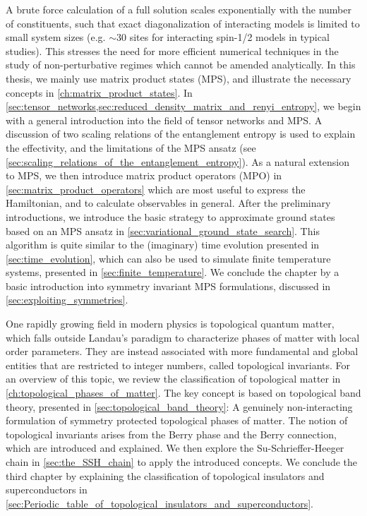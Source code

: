 A brute force calculation of a full solution scales exponentially with the number of constituents, such that exact diagonalization of interacting models is limited to small system sizes (e.g. $\sim 30$ sites for interacting spin-1/2 models in typical studies).
This stresses the need for more efficient numerical techniques in the study of non-perturbative regimes which cannot be amended analytically.
In this thesis, we mainly use matrix product states (MPS), and illustrate the necessary concepts in \cref{ch:matrix_product_states}.
In \cref{sec:tensor_networks,sec:reduced_density_matrix_and_renyi_entropy}, we begin with a general introduction into the field of tensor networks and MPS.
A discussion of two scaling relations of the entanglement entropy is used to explain the effectivity, and the limitations of the MPS ansatz (see \cref{sec:scaling_relations_of_the_entanglement_entropy}).
As a natural extension to MPS, we then introduce matrix product operators (MPO) in \cref{sec:matrix_product_operators} which are most useful to express the Hamiltonian, and to calculate observables in general.
After the preliminary introductions, we introduce the basic strategy to approximate ground states based on an MPS ansatz in \cref{sec:variational_ground_state_search}.
This algorithm is quite similar to the (imaginary) time evolution presented in \cref{sec:time_evolution}, which can also be used to simulate finite temperature systems, presented in \cref{sec:finite_temperature}.
We conclude the chapter by a basic introduction into symmetry invariant MPS formulations, discussed in \cref{sec:exploiting_symmetries}.

One rapidly growing field in modern physics is topological quantum matter, which falls outside Landau's paradigm to characterize phases of matter with local order parameters.
They are instead associated with more fundamental and global entities that are restricted to integer numbers, called topological invariants.
For an overview of this topic, we review the classification of topological matter in \cref{ch:topological_phases_of_matter}.
The key concept is based on topological band theory, presented in \cref{sec:topological_band_theory}: A genuinely non-interacting formulation of symmetry protected topological phases of matter.
The notion of topological invariants arises from the Berry phase and the Berry connection, which are introduced and explained.
We then explore the Su-Schrieffer-Heeger chain in \cref{sec:the_SSH_chain} to apply the introduced concepts.
We conclude the third chapter by explaining the classification of topological insulators and superconductors in \cref{sec:Periodic_table_of_topological_insulators_and_superconductors}.

